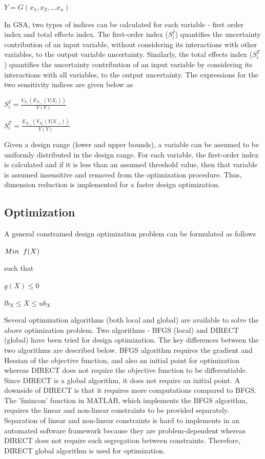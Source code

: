 \documentclass[10pt]{article}
\begin{document}
\centerline{$Y = G(x_{1}, x_{2}, ... x_{n})$}

In GSA, two types of indices can be calculated for each variable - first order index and total effects index. The first-order index ($S_{i}^{I}$) quantifies the uncertainty contribution of an input variable, without considering its interactions with other variables, to the output variable uncertainty. Similarly, the total effects index ($S_{i}^{T}$) quantifies the uncertainty contribution of an input variable by considering its interactions with all variables, to the output uncertainty. The expressions for the two sensitivity indices are given below as 

\centerline{$S_{i}^{I} = \frac{V_{X_i}(E_{X_{-i}}(Y|X_{i}))}{V(Y)}$}
\centerline{$S_{i}^{T} = \frac{E_{X_{-i}}(V_{X_{i}}(Y|X_{-i}))}{V(Y)}$}

Given a design range (lower and upper bounds), a variable can be assumed to be uniformly distributed in the design range. For each variable, the first-order index is calculated and if it is less than an assumed threshold value, then that variable is assumed insensitive and removed from the optimization procedure. Thus, dimension reduction is implemented for a faster design optimization.\cite{Bioinformatics} \cite{Wrappers} \cite{Error} \cite{Global}


\subsection{Optimization}
\label{sec:Optimization}
\hspace{5 mm} A general constrained design optimization problem can be formulated as follows

\centerline{$Min \hspace{2 mm} f(X)$}
such that

\centerline{$g(X) \leq 0$}
\centerline{$lb_{X} \leq X \leq ub_{X}$}

\noindent Several optimization algorithms (both local and global) are available to solve the above optimization problem. Two algorithms - BFGS (local) and DIRECT (global) have been tried for design optimization. The key differences between the two algorithms are described below. BFGS algorithm requires the gradient and Hessian of the objective function, and also an initial point for optimization whereas DIRECT does not require the objective function to be differentiable. Since DIRECT is a global algorithm, it does not require an initial point. A downside of DIRECT is that it requires more computations compared to BFGS. The 'fmincon' function in MATLAB, which implements the BFGS algorithm, requires the linear and non-linear constraints to be provided separately. Separation of linear and non-linear constraints is hard to implements in an automated software framework because they are problem-dependent whereas DIRECT does not require such segregation between constraints. Therefore, DIRECT global algorithm is used for optimization.
\end{document}
